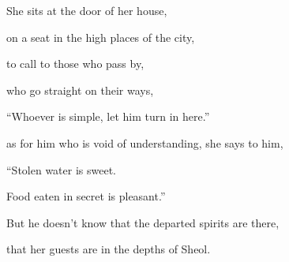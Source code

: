 {\par }{\Q {}She sits at the door of her house,
\par }{\QB on a seat in the high places of the city,
\par }{\Q {}to call to those who pass by,
\par }{\QB who go straight on their ways,
\par }{\Q {}“Whoever is simple, let him turn in here.”
\par }{\QB as for him who is void of understanding, she says to him,
\par }{\Q {}“Stolen water is sweet.
\par }{\QB Food eaten in secret is pleasant.”
\par }{\Q {}But he doesn’t know that the departed spirits are there,
\par }{\QB that her guests are in the depths of Sheol.

}
